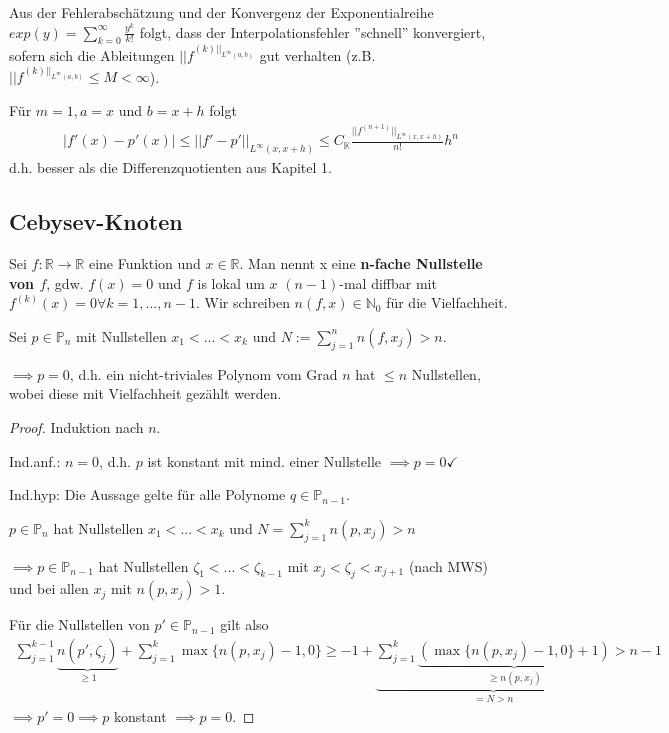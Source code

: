 \begin{remark}
	Aus der Fehlerabschätzung und der Konvergenz der Exponentialreihe $exp(y) = \sum_{k=0}^{\infty}\frac{y^k}{k!}$ folgt, dass der Interpolationsfehler ''schnell'' konvergiert, sofern sich die Ableitungen $||f^{(k)||_{L^\infty(a,b)}}$ gut verhalten (z.B. $||f^{(k)||_{L^\infty(a,b)}} \leq M < \infty$).
\end{remark}

\begin{remark}
	Für $m=1, a = x$ und $b = x+h$ folgt
	\begin{align*}
		|f'(x)-p'(x)| \leq ||f'-p'||_{L^\infty(x,x+h)} \leq C_{\mathbb{K}} \frac{||f^{(n+1)}||_{L^\infty(x,x+h)}}{n!} h^n
	\end{align*}
	d.h. besser als die Differenzquotienten aus Kapitel 1.
\end{remark}

\subsection{Cebysev-Knoten}

\begin{definition}
	Sei $f:\mathbb{R} \rightarrow \mathbb{R}$ eine Funktion und $x \in \mathbb{R}$. Man nennt x eine \textbf{n-fache Nullstelle von $f$}, gdw. $f(x)=0$ und $f$ is lokal um $x$ $(n-1)$-mal diffbar mit $f^{(k)}(x)=0 \forall k=1, ..., n-1$. Wir schreiben $n(f,x) \in \mathbb{N}_0$ für die Vielfachheit.
\end{definition}

\begin{lemma}
	Sei $p \in \mathbb{P}_n$ mit Nullstellen $x_1 < ... < x_k$ und $N := \sum_{j=1}^{n}n(f,x_j) > n$.
	
	$\implies p=0$, d.h. ein nicht-triviales Polynom vom Grad $n$ hat $\leq n$ Nullstellen, wobei diese mit Vielfachheit gezählt werden.
\end{lemma}

\begin{proof}
	Induktion nach $n$.
	
	Ind.anf.: $n=0$, d.h. $p$ ist konstant mit mind. einer Nullstelle $\implies p=0 \checkmark$
	
	Ind.hyp: Die Aussage gelte für alle Polynome $q \in \mathbb{P}_{n-1}$.
	
	$p \in \mathbb{P}_n$ hat Nullstellen $x_1 < ... < x_k$ und $N = \sum_{j=1}^{k}n(p, x_j) > n$
	
	$\implies p \in \mathbb{P}_{n-1}$ hat Nullstellen $\zeta_1 < ... < \zeta_{k-1}$ mit $x_j < \zeta_j < x_{j+1}$ (nach MWS) und bei allen $x_j$ mit $n(p,x_j)>1$.
	
	Für die Nullstellen von $p'\in \mathbb{P}_{n-1}$ gilt also
	\begin{align*}
		\sum_{j=1}^{k-1} \underbrace{n(p',\zeta_j)}_{\geq 1} + \sum_{j=1}^{k} \max\{n(p,x_j)-1, 0\}
		\geq -1 + \underbrace{\sum_{j=1}^{k} \underbrace{(\max\{n(p,x_j) - 1, 0\} + 1)}_{\geq n(p,x_j)} }_{=N > n} > n-1
	\end{align*}
	$\implies p' = 0 \implies p$ konstant $\implies p=0$.
\end{proof}

